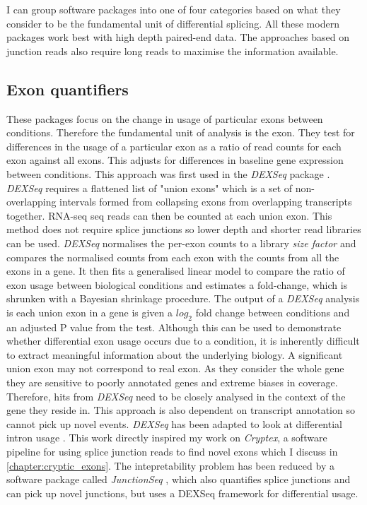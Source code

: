 I can group software packages into one of four categories based on what they consider to be the fundamental unit of differential splicing. 
All these modern packages work best with high depth paired-end data.
The approaches based on junction reads also require long reads to maximise the information available.

\subsection{Exon quantifiers}

These packages focus on the change in usage of particular exons between conditions. Therefore the fundamental unit of analysis is the exon.
They test for differences in the usage of a particular exon as a ratio of read counts for each exon against all exons. 
This adjusts for differences in baseline gene expression between conditions. 
This approach was first used in the \textit{DEXSeq} package \citep{Anders2012}. 
\textit{DEXSeq} requires a flattened list of "union exons" which is a set of non-overlapping intervals formed from collapsing exons from overlapping transcripts together.
RNA-seq seq reads can then be counted at each union exon. 
This method does not require splice junctions so lower depth and shorter read libraries can be used.
\textit{DEXSeq} normalises the per-exon counts to a library \textit{size factor} and compares the  normalised counts from each exon with the counts from all the exons in a gene.
It then fits a generalised linear model to compare the ratio of exon usage between biological conditions and estimates a fold-change, which is shrunken with a Bayesian shrinkage procedure.
The output of a \textit{DEXSeq} analysis is each union exon in a gene is given a $log_2$ fold change between conditions and an adjusted P value from the test. 
Although this can be used to demonstrate whether differential exon usage occurs due to a condition, it is inherently difficult to extract meaningful information about the underlying biology. 
A significant union exon may not correspond to real exon. 
As they consider the whole gene they are sensitive to poorly annotated genes and extreme biases in coverage.
Therefore, hits from \textit{DEXSeq} need to be closely analysed in the context of the gene they reside in. 
This approach is also dependent on transcript annotation so cannot pick up novel events.
\textit{DEXSeq} has been adapted to look at differential intron usage \citep{Li2015a}.
This work directly inspired my work on \textit{Cryptex}, a software pipeline for using splice junction reads to find novel exons which I discuss in \autoref{chapter:cryptic_exons}.
The intepretability problem has been reduced by a software package called \textit{JunctionSeq} \citep{Hartley2015}, which also quantifies splice junctions and can pick up novel junctions, but uses a DEXSeq framework for differential usage.

